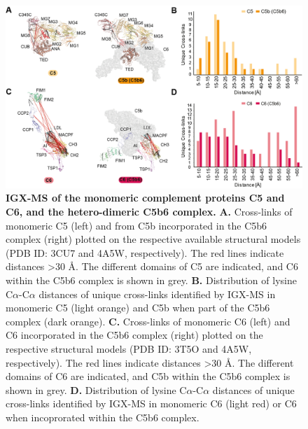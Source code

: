 \begin{figure}[b!]
    \center
    \includegraphics[]{Chapter.2/Figures/Figure5.png}
    \caption{\textbf{IGX-MS of the monomeric complement proteins C5 and C6, and the hetero-dimeric C5b6 complex.} \textbf{A.} Cross-links of monomeric C5 (left) and from C5b incorporated in the C5b6 complex (right) plotted on the respective available structural models (PDB ID: 3CU7 and 4A5W, respectively). The red lines indicate distances >30 Å. The different domains of C5 are indicated, and C6 within the C5b6 complex is shown in grey. \textbf{B.} Distribution of lysine C$\alpha$-C$\alpha$ distances of unique cross-links identified by IGX-MS in monomeric C5 (light orange) and C5b when part of the C5b6 complex (dark orange). \textbf{C.} Cross-links of monomeric C6 (left) and C6 incorporated in the C5b6 complex (right) plotted on the respective structural models (PDB ID: 3T5O and 4A5W, respectively). The red lines indicate distances >30 Å. The different domains of C6 are indicated, and C5b within the C5b6 complex is shown in grey. \textbf{D.} Distribution of lysine C$\alpha$-C$\alpha$ distances of unique cross-links identified by IGX-MS in monomeric C6 (light red) or C6 when incoprorated within the C5b6 complex.}
    \label{fig:ch2_fig5}
\end{figure}
